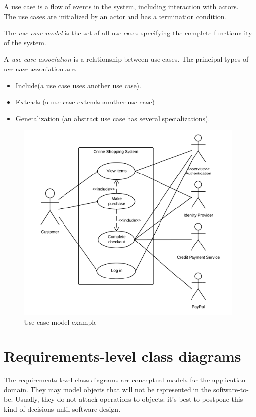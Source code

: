 \documentclass[12pt, a4paper]{report}
\begin{document}
    A use case is a flow of events in the system, including interaction with actors. The use cases are initialized by an actor and has a termination condition. 
    \begin{definition}
        The \emph{use case model} is the set of all use cases specifying the complete functionality of the system. 
    \end{definition}
    \begin{definition}
        A \emph{use case association} is a relationship between use cases. The principal types of use case association are: 
        \begin{itemize}
            \item Include(a use case uses another use case).
            \item Extends (a use case extends another use case).
            \item Generalization (an abstract use case has several specializations).
        \end{itemize}
    \end{definition}
    \begin{figure}[H]
        \centering
        \includegraphics[width=0.5\linewidth]{images/usecase.png}
        \caption{Use case model example}
    \end{figure}
\section{Requirements-level class diagrams}
    The requirements-level class diagrams are conceptual models for the application domain. They may model objects that will not be represented in the software-to-be. Usually, they 
    do not attach operations to objects: it's best to postpone this kind of decisions until software design. 
     
\end{document}
